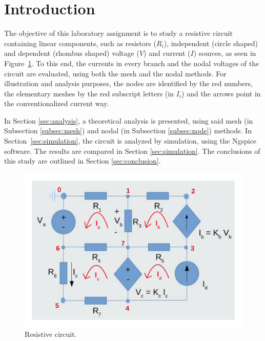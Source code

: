 \section{Introduction}
\label{sec:introduction}

The objective of this laboratory assignment is to study a resistive circuit containing linear components, such as resistors ($R_i$), independent (circle shaped) and dependent (rhombus shaped) voltage ($V$) and current ($I$) sources, as seen in Figure~\ref{fig:esq}. To this end, the currents in every branch and the nodal voltages of the circuit are evaluated, using both the mesh and the nodal methods. For illustration and analysis purposes, the nodes are identified by the red numbers, the elementary meshes by the red subscript letters (in $I_i$) and the arrows point in the conventionalized current way.

In Section \ref{sec:analysis}, a theoretical analysis is presented, using said mesh (in Subsection \ref{subsec:mesh}) and nodal (in Subsection \ref{subsec:node}) methods. In Section~\ref{sec:simulation}, the circuit is analyzed by simulation, using the Ngspice software.
The results are compared in Section \ref{sec:simulation}. The conclusions of this study are outlined in
Section \ref{sec:conclusion}.



\begin{figure}[h] \centering
\includegraphics[width=0.8\linewidth]{esq_circ.pdf}
\caption{Resistive circuit.}
\label{fig:esq}
\end{figure}

